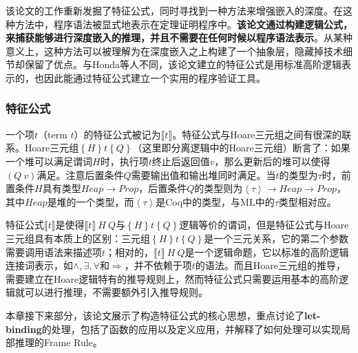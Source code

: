 \documentclass[a4paper,11pt]{article}
\begin{document}
	该论文的工作重新发掘了特征公式，同时寻找到一种方法来增强嵌入的深度。在这种方法中，程序语法被显式地表示在定理证明程序中。\textbf{该论文通过构建逻辑公式，来捕获能够进行深度嵌入的推理，并且不需要在任何时候以程序语法表示}。从某种意义上，这种方法可以被理解为在深度嵌入之上构建了一个抽象层，隐藏掉技术细节却保留了优点。与Honda等人不同，该论文建立的特征公式是用标准高阶逻辑表示的，也因此能通过特征公式建立一个实用的程序验证工具。

\subsubsection{特征公式}
	一个项$t$（term $t$）的特征公式被记为$\llbracket t \rrbracket$。特征公式与Hoare三元组之间有很深的联系。Hoare三元组$\left \{H \right \} t \left \{Q \right \}$（这里即分离逻辑中的Hoare三元组）断言了：如果一个堆可以满足谓词$H$时，执行项$t$终止后返回值$v$，那么更新后的堆可以使得$(Q~v)$满足。注意后置条件$Q$需要输出值和输出堆同时满足。当$t$的类型为$\tau$时，前置条件$H$具有类型$Heap \to Prop$，后置条件$Q$的类型则为$\left \langle \tau \right \rangle \to Heap \to Prop$，其中$Heap$是堆的一个类型，而$\left \langle \tau \right \rangle$是Coq中的类型，与ML中的$\tau$类型相对应。

特征公式$\llbracket t \rrbracket$是使得$\llbracket t \rrbracket~H~Q$与$\left \{H \right \} t \left \{Q \right \}$逻辑等价的谓词，但是特征公式与Hoare三元组具有本质上的区别：三元组$\left \{H \right \} t \left \{Q \right \}$是一个三元关系，它的第二个参数需要调用语法来描述项$t$；相对的，$\llbracket t \rrbracket~H~Q$是一个逻辑命题，它以标准的高阶逻辑连接词表示，如$\wedge ,\exists ,\forall$和$\Rightarrow$，并不依赖于项$t$的语法。而且Hoare三元组的推导，需要建立在Hoare逻辑特有的推导规则上，然而特征公式只需要运用基本的高阶逻辑就可以进行推理，不需要额外引入推导规则。

本章接下来部分，该论文展示了构造特征公式的核心思想，重点讨论了\textbf{let-binding}的处理，包括了函数的应用以及定义应用，并解释了如何处理可以实现局部推理的Frame Rule。
\end{document}
